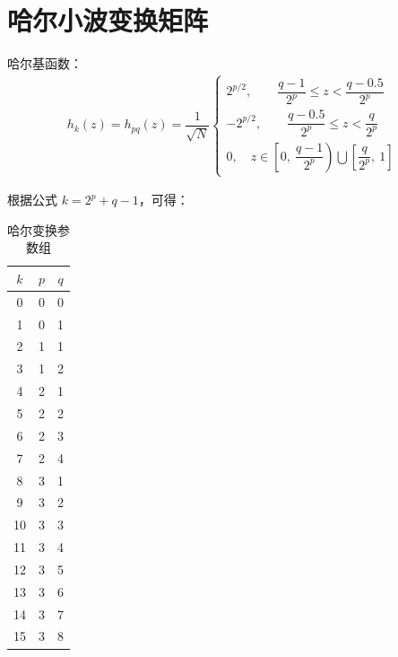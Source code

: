 \documentclass{article}
\begin{document}
\section{哈尔小波变换矩阵}
哈尔基函数：
\begin{align*}
    h_k(z)=h_{pq}(z)=\dfrac{1}{\sqrt{N}}\begin{cases}
        2^{p/2},\qquad \dfrac{q-1}{\displaystyle2^p}\leqslant z<\dfrac{q-0.5}{\displaystyle2^p}
        \\[10pt]
        -2^{p/2},\qquad \dfrac{q-0.5}{\displaystyle2^p}\leqslant z<\dfrac{q}{\displaystyle2^p}
        \\[10pt]
        0,\quad z\in\left[0,\ \dfrac{q-1}{\displaystyle2^p}\right)\bigcup\left[\dfrac{q}{\displaystyle2^p},\ 1\right]
    \end{cases}
\end{align*}

根据公式 $k=2^{p}+q-1$，可得：
\begin{table}[H]
    \centering
    \setlength{\tabcolsep}{64pt}
    \renewcommand{\arraystretch}{1.2}
    \caption{哈尔变换参数组}
    \begin{tabular}{ccc}
        \bottomrule[1.5pt]
        $k$ & $p$ & $q$ \\
        \midrule[0.75pt]
        0 & 0 & 0\\
        1 & 0 & 1 \\
        \hline
        2 & 1 & 1 \\
        3 & 1 & 2 \\
        \hline
        4 & 2 & 1 \\
        5 & 2 & 2 \\
        6 & 2 & 3 \\
        7 & 2 & 4 \\
        \hline
        8 & 3 & 1 \\
        9 & 3 & 2 \\
        10 & 3 & 3 \\
        11 & 3 & 4 \\
        12 & 3 & 5 \\
        13 & 3 & 6 \\
        14 & 3 & 7 \\
        15 & 3 & 8 \\
        \toprule[1.5pt]
    \end{tabular}
\end{table}
\end{document}
